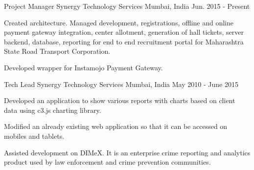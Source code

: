 

\begin{cventries}

  \cventry
    {Project Manager} %
    {Synergy Technology Services} %
    {Mumbai, India} %
    {Jun. 2015 - Present} %
    {
      \begin{cvitems} %
        \item {Created architecture. Managed development, registrations, offline and online payment gateway integration, center allotment, generation of hall tickets, server backend, database, reporting for end to end recruitment portal for Maharashtra State Road Transport Corporation.}
        \item {Developed wrapper for Instamojo Payment Gateway.}
      \end{cvitems}
    }

  \cventry
    {Tech Lead} %
    {Synergy Technology Services} %
    {Mumbai, India} %
    {May 2010 - June 2015} %
    {
      \begin{cvitems} %
        \item {Developed an application to show various reports with charts based on client data using c3.js charting library.}
        \item {Modified an already existing web application so that it can be accessed on mobiles and tablets.}
        \item {Assisted development on DIMeX. It is an enterprise crime reporting and analytics product used by law enforcement and crime prevention communities.}
      \end{cvitems}
    }


\end{cventries}
